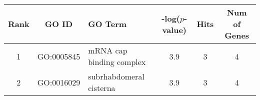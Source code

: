 \centering \begin{tabular}{c|c|p{3in}|c|c|c}
Rank	&GO ID	&GO Term	&-log($p$-value)	&Hits	&Num of Genes\\\hline
1	&GO:0005845	&mRNA cap binding complex	&3.9	&3	&4\\
2	&GO:0016029	&subrhabdomeral cisterna	&3.9	&3	&4\\
\end{tabular}
